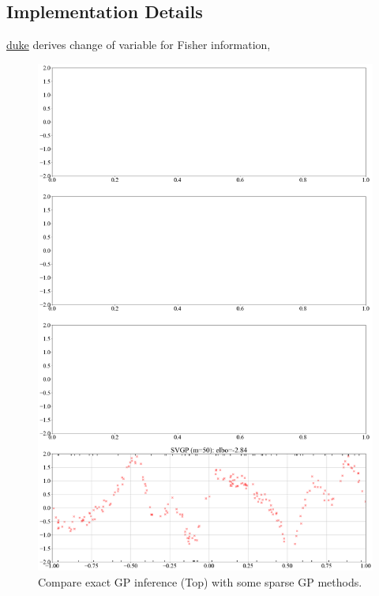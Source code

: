 \documentclass[11pt]{article}
\begin{document}
\subsection{Implementation Details}

\href{https://www2.stat.duke.edu/courses/Spring16/sta532/lec/fish.pdf}{duke} derives change of variable for Fisher information, 



\begin{figure}[h!]
\begin{center} 
\includegraphics[width=\textwidth]{assets/plt_apx_comparison.png}
\caption{Compare exact GP inference (Top) with some sparse GP methods.}
\label{fig:plt_apx_comparison}
\end{center}
\end{figure}
\end{document}
